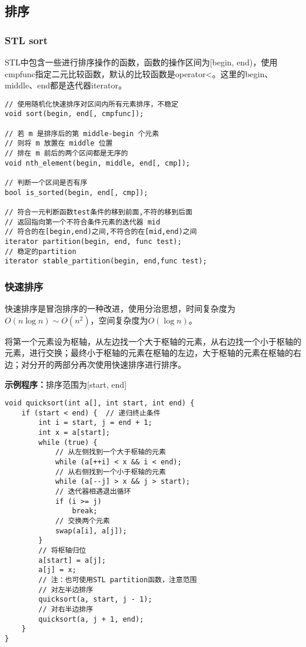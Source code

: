\subsection{排序}

\subsubsection{STL sort}

STL中包含一些进行排序操作的函数，函数的操作区间为[begin, end)，使用cmpfunc指定二元比较函数，默认的比较函数是operator<。这里的begin、middle、end都是迭代器iterator。

\begin{lstlisting}
// 使用随机化快速排序对区间内所有元素排序，不稳定
void sort(begin, end[, cmpfunc]);

// 若 m 是排序后的第 middle-begin 个元素
// 则将 m 放置在 middle 位置
// 排在 m 前后的两个区间都是无序的
void nth_element(begin, middle, end[, cmp]);

// 判断一个区间是否有序
bool is_sorted(begin, end[, cmp]);

// 符合一元判断函数test条件的移到前面,不符的移到后面
// 返回指向第一个不符合条件元素的迭代器 mid
// 符合的在[begin,end)之间,不符合的在[mid,end)之间
iterator partition(begin, end, func test);
// 稳定的partition
iterator stable_partition(begin, end,func test);
\end{lstlisting}

\subsubsection{快速排序}

快速排序是冒泡排序的一种改进，使用分治思想，时间复杂度为$O(n\log n)\sim O(n^2)$，空间复杂度为$O(\log n)$。

将第一个元素设为枢轴，从左边找一个大于枢轴的元素，从右边找一个小于枢轴的元素，进行交换；最终小于枢轴的元素在枢轴的左边，大于枢轴的元素在枢轴的右边；对分开的两部分再次使用快速排序进行排序。

\textbf{示例程序：}排序范围为[start, end]

\begin{lstlisting}
void quicksort(int a[], int start, int end) {
	if (start < end) {	// 递归终止条件
		int i = start, j = end + 1;
		int x = a[start];
		while (true) {
			// 从左侧找到一个大于枢轴的元素
			while (a[++i] < x && i < end);
			// 从右侧找到一个小于枢轴的元素
			while (a[--j] > x && j > start);
			// 迭代器相遇退出循环
			if (i >= j)
				break;
			// 交换两个元素
			swap(a[i], a[j]);
		}
		// 将枢轴归位
		a[start] = a[j];
		a[j] = x;
		// 注：也可使用STL partition函数，注意范围
		// 对左半边排序
		quicksort(a, start, j - 1);
		// 对右半边排序
		quicksort(a, j + 1, end);
	}
}
\end{lstlisting}

